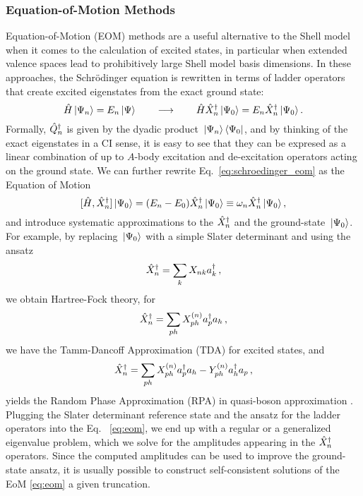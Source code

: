 {%
%
\subsubsection{Equation-of-Motion Methods}

Equation-of-Motion (EOM) methods \cite{Rowe:1968eq} are a useful alternative
to the Shell model when it comes to the calculation of excited states,
in particular when extended valence spaces lead to prohibitively large
Shell model basis dimensions. In these approaches, the Schr\"odinger
equation is rewritten in terms of ladder operators
that create excited eigenstates from the exact ground state:
\begin{equation}\label{eq:schroedinger_eom}
  \HO\ket{\Psi_n} = E_n\ket{\Psi} \qquad\longrightarrow\qquad \HO\XXO_n\ket{\Psi_0} = E_n\XXO_n\ket{\Psi_0}\,.
\end{equation}
Formally, $\hat{Q}^\dag_n$ is given by the dyadic product $\,|{\Psi_n}\rangle\bra{\Psi_0}$,
and by thinking of the exact eigenstates in a CI sense, it is easy to see that 
they can be expresed as a linear combination of up to $A$-body excitation and 
de-excitation operators acting on the ground state. We can further rewrite
Eq.~\eqref{eq:schroedinger_eom} as the Equation of Motion
\begin{equation}\label{eq:eom}
  \comm{\HO}{\XXO_n}\ket{\Psi_0} = (E_n-E_0)\XXO_n\ket{\Psi_0} \equiv \omega_n \XXO_n\ket{\Psi_0}\,,
\end{equation}
and introduce systematic approximations to the $\hat{X}^\dag_n$ and the ground-state 
$\,|{\Psi_0}\rangle$. For example, by replacing $\,|{\Psi_0}\rangle$ with a simple Slater 
determinant and using the ansatz 
\begin{equation}
  \hat{X}^\dag_n = \sum_k X_{nk}a^\dag_k\,, 
\end{equation}
we obtain Hartree-Fock theory, for
\begin{equation}
  \hat{X}^\dag_n = \sum_{ph} X^{(n)}_{ph}a^\dag_pa_h\,, 
\end{equation}
we have the Tamm-Dancoff Approximation (TDA) for excited states, and
\begin{equation}\label{eq:rpa_ladder}
  \XXO_n = \sum_{ph} X^{(n)}_{ph}\aaO_p\aO_h - Y^{(n)}_{ph}\aaO_h\aO_p\,, 
\end{equation}
yields the Random Phase Approximation (RPA) in quasi-boson approximation
\cite{Ring:1980bb,Suhonen:2007wo}. Plugging the Slater determinant reference
state and the ansatz for the ladder operators into the Eq.~ 
\eqref{eq:eom}, we end up with a regular or a generalized eigenvalue problem, 
which we solve for the amplitudes appearing in the $\hat{X}^\dag_n$ operators. Since 
the computed amplitudes can be used to improve the ground-state ansatz, it is
usually possible to construct self-consistent solutions of the EoM \eqref{eq:eom}
a given truncation.

}
